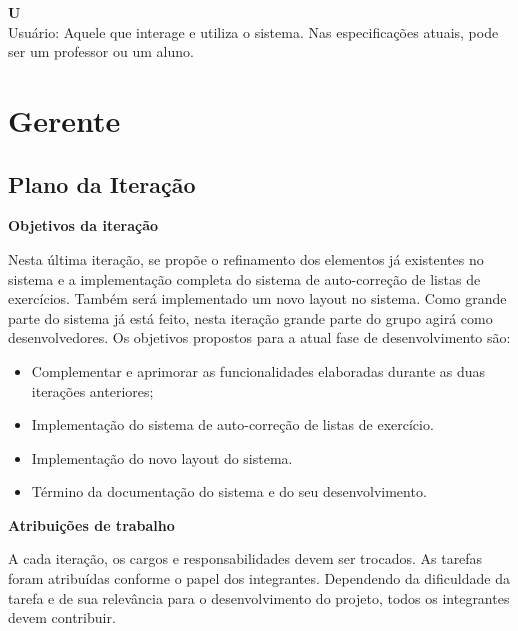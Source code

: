 \documentclass[12pt,letterpaper]{article}
\begin{document}
  {\bf U}\\
    Usuário: Aquele que interage e utiliza o sistema. Nas especificações
    atuais, pode ser um professor ou um aluno.

\pagebreak



\section{Gerente}

\subsection{Plano da Iteração}

\vspace{1cm}
{\large {\bf Objetivos da iteração}}
\vspace{0.5cm}

Nesta última iteração, se propõe o refinamento dos elementos já existentes no sistema e a implementação completa do sistema de auto-correção de listas de exercícios. Também será implementado um novo layout no sistema. Como grande parte do sistema já está feito, nesta iteração grande parte do grupo agirá como desenvolvedores.
Os objetivos propostos para a atual fase de desenvolvimento são:

\begin{itemize}
\item{} Complementar e aprimorar as funcionalidades elaboradas durante as duas iterações anteriores;
\item{} Implementação do sistema de auto-correção de listas de exercício.
\item{} Implementação do novo layout do sistema.
\item{} Término da documentação do sistema e do seu desenvolvimento.
\end{itemize}

\vspace{1cm}
{\large {\bf Atribuições de trabalho}}
\vspace{0.5cm}

A cada iteração, os cargos e responsabilidades devem ser trocados. As tarefas foram atribuídas conforme o papel dos integrantes. Dependendo da dificuldade da tarefa e de sua relevância para o desenvolvimento do projeto, todos os integrantes devem contribuir.
\end{document}
